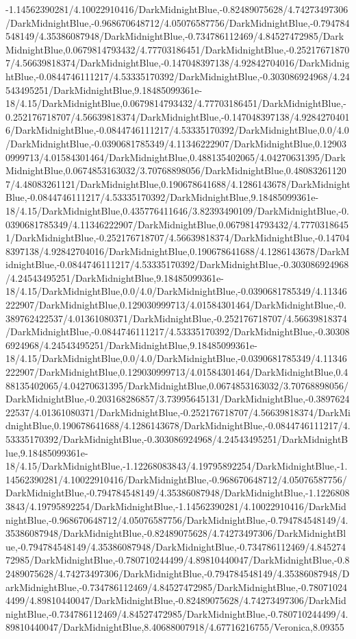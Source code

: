 {\begin{tikzternal}
{-1.14562390281/4.10022910416/DarkMidnightBlue,-0.82489075628/4.74273497306/DarkMidnightBlue,-0.968670648712/4.05076587756/DarkMidnightBlue,-0.794784548149/4.35386087948/DarkMidnightBlue,-0.734786112469/4.84527472985/DarkMidnightBlue,0.0679814793432/4.77703186451/DarkMidnightBlue,-0.252176718707/4.56639818374/DarkMidnightBlue,-0.147048397138/4.92842704016/DarkMidnightBlue,-0.0844746111217/4.53335170392/DarkMidnightBlue,-0.303086924968/4.24543495251/DarkMidnightBlue,9.18485099361e-18/4.15/DarkMidnightBlue,0.0679814793432/4.77703186451/DarkMidnightBlue,-0.252176718707/4.56639818374/DarkMidnightBlue,-0.147048397138/4.92842704016/DarkMidnightBlue,-0.0844746111217/4.53335170392/DarkMidnightBlue,0.0/4.0/DarkMidnightBlue,-0.0390681785349/4.11346222907/DarkMidnightBlue,0.129030999713/4.01584301464/DarkMidnightBlue,0.488135402065/4.04270631395/DarkMidnightBlue,0.0674853163032/3.70768898056/DarkMidnightBlue,0.480832611207/4.48083261121/DarkMidnightBlue,0.190678641688/4.1286143678/DarkMidnightBlue,-0.0844746111217/4.53335170392/DarkMidnightBlue,9.18485099361e-18/4.15/DarkMidnightBlue,0.435776411646/3.82393490109/DarkMidnightBlue,-0.0390681785349/4.11346222907/DarkMidnightBlue,0.0679814793432/4.77703186451/DarkMidnightBlue,-0.252176718707/4.56639818374/DarkMidnightBlue,-0.147048397138/4.92842704016/DarkMidnightBlue,0.190678641688/4.1286143678/DarkMidnightBlue,-0.0844746111217/4.53335170392/DarkMidnightBlue,-0.303086924968/4.24543495251/DarkMidnightBlue,9.18485099361e-18/4.15/DarkMidnightBlue,0.0/4.0/DarkMidnightBlue,-0.0390681785349/4.11346222907/DarkMidnightBlue,0.129030999713/4.01584301464/DarkMidnightBlue,-0.389762422537/4.01361080371/DarkMidnightBlue,-0.252176718707/4.56639818374/DarkMidnightBlue,-0.0844746111217/4.53335170392/DarkMidnightBlue,-0.303086924968/4.24543495251/DarkMidnightBlue,9.18485099361e-18/4.15/DarkMidnightBlue,0.0/4.0/DarkMidnightBlue,-0.0390681785349/4.11346222907/DarkMidnightBlue,0.129030999713/4.01584301464/DarkMidnightBlue,0.488135402065/4.04270631395/DarkMidnightBlue,0.0674853163032/3.70768898056/DarkMidnightBlue,-0.203168286857/3.73995645131/DarkMidnightBlue,-0.389762422537/4.01361080371/DarkMidnightBlue,-0.252176718707/4.56639818374/DarkMidnightBlue,0.190678641688/4.1286143678/DarkMidnightBlue,-0.0844746111217/4.53335170392/DarkMidnightBlue,-0.303086924968/4.24543495251/DarkMidnightBlue,9.18485099361e-18/4.15/DarkMidnightBlue,-1.12268083843/4.19795892254/DarkMidnightBlue,-1.14562390281/4.10022910416/DarkMidnightBlue,-0.968670648712/4.05076587756/DarkMidnightBlue,-0.794784548149/4.35386087948/DarkMidnightBlue,-1.12268083843/4.19795892254/DarkMidnightBlue,-1.14562390281/4.10022910416/DarkMidnightBlue,-0.968670648712/4.05076587756/DarkMidnightBlue,-0.794784548149/4.35386087948/DarkMidnightBlue,-0.82489075628/4.74273497306/DarkMidnightBlue,-0.794784548149/4.35386087948/DarkMidnightBlue,-0.734786112469/4.84527472985/DarkMidnightBlue,-0.780710244499/4.89810440047/DarkMidnightBlue,-0.82489075628/4.74273497306/DarkMidnightBlue,-0.794784548149/4.35386087948/DarkMidnightBlue,-0.734786112469/4.84527472985/DarkMidnightBlue,-0.780710244499/4.89810440047/DarkMidnightBlue,-0.82489075628/4.74273497306/DarkMidnightBlue,-0.734786112469/4.84527472985/DarkMidnightBlue,-0.780710244499/4.89810440047/DarkMidnightBlue,8.40688007918/4.67716216755/Veronica,8.09355}
\end{tikzternal}}
